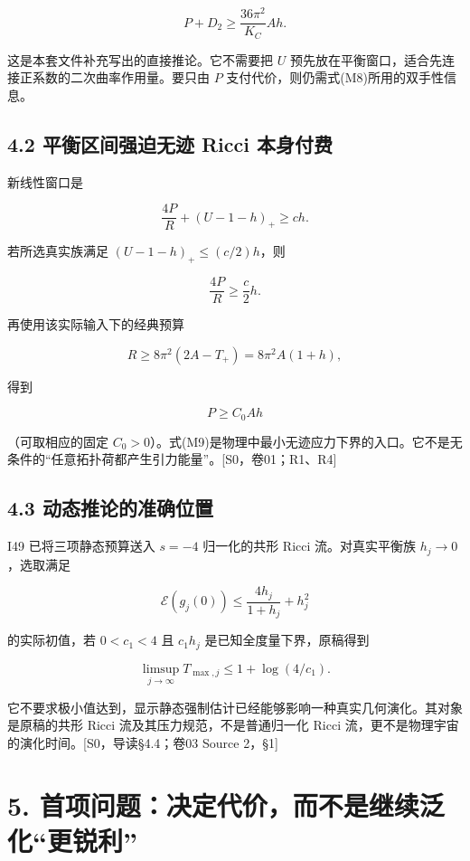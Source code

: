 \documentclass[UTF8,a4paper,11pt,fontset=fandol]{ctexart}
\begin{document}
\[
\boxed{P+D_2\ge\frac{36\pi^2}{K_C}Ah.}
\tag{M7}
\]

这是本套文件补充写出的直接推论。它不需要把 \(U\)
预先放在平衡窗口，适合先连接正系数的二次曲率作用量。要只由 \(P\)
支付代价，则仍需式(M8)所用的双手性信息。

\subsection{4.2 平衡区间强迫无迹 Ricci
本身付费}\label{ux5e73ux8861ux533aux95f4ux5f3aux8febux65e0ux8ff9-ricci-ux672cux8eabux4ed8ux8d39}

新线性窗口是

\[
\frac{4P}{R}+(U-1-h)_+\ge ch.
\tag{M8}
\]

若所选真实族满足 \((U-1-h)_+\le(c/2)h\)，则

\[
\frac{4P}{R}\ge\frac c2h.
\]

再使用该实际输入下的经典预算

\[
R\ge8\pi^2(2A-T_+)=8\pi^2A(1+h),
\]

得到

\[
\boxed{P\ge C_0Ah}
\tag{M9}
\]

（可取相应的固定
\(C_0>0\)）。式(M9)是物理中最小无迹应力下界的入口。它不是无条件的``任意拓扑荷都产生引力能量''。{[}S0，卷01；R1、R4{]}

\subsection{4.3
动态推论的准确位置}\label{ux52a8ux6001ux63a8ux8bbaux7684ux51c6ux786eux4f4dux7f6e}

I49 已将三项静态预算送入 \(s=-4\) 归一化的共形 Ricci 流。对真实平衡族
\(h_j\to0\)，选取满足

\[
\mathcal E(g_j(0))\le\frac{4h_j}{1+h_j}+h_j^2
\]

的实际初值，若 \(0<c_1<4\) 且 \(c_1h_j\) 是已知全度量下界，原稿得到

\[
\limsup_{j\to\infty}T_{\max,j}\le1+\log(4/c_1).
\tag{M9a}
\]

它不要求极小值达到，显示静态强制估计已经能够影响一种真实几何演化。其对象是原稿的共形
Ricci 流及其压力规范，不是普通归一化 Ricci
流，更不是物理宇宙的演化时间。{[}S0，导读§4.4；卷03 Source 2，§1{]}

\section{5.
首项问题：决定代价，而不是继续泛化``更锐利''}\label{ux9996ux9879ux95eeux9898ux51b3ux5b9aux4ee3ux4ef7ux800cux4e0dux662fux7ee7ux7eedux6cdbux5316ux66f4ux9510ux5229}
\end{document}
